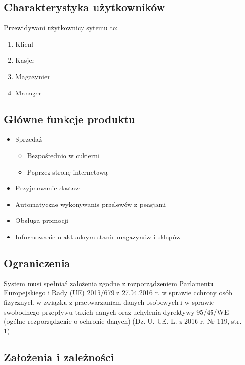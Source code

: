 \documentclass{article}
\begin{document}
\subsection{Charakterystyka użytkowników}
Przewidywani użytkownicy sytemu to:
\begin{enumerate}
\item Klient
\item Kasjer
\item Magazynier
\item Manager 
\end{enumerate}
\subsection{Główne funkcje produktu}
\begin{itemize}
    \item Sprzedaż
    \begin{itemize}
        \item  Bezpośrednio w cukierni
        \item  Poprzez stronę internetową
    \end{itemize}

    \item Przyjmowanie dostaw
    \item Automatyczne wykonywanie przelewów z pensjami
    \item Obsługa promocji
    \item Informowanie o aktualnym stanie magazynów i sklepów
\end{itemize}
\subsection{Ograniczenia}
System musi spełniać założenia zgodne z rozporządzeniem Parlamentu Europejskiego i Rady (UE) 2016/679 z 27.04.2016 r. w sprawie ochrony osób fizycznych w związku z przetwarzaniem danych osobowych i w sprawie swobodnego przepływu takich danych oraz uchylenia dyrektywy 95/46/WE (ogólne rozporządzenie o ochronie danych) (Dz. U. UE. L. z 2016 r. Nr 119, str. 1).

\subsection{Założenia i zależności}
\end{document}
